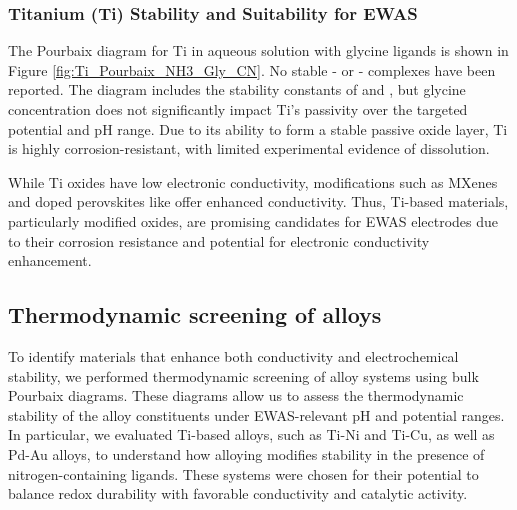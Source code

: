 \documentclass[journal=jacsat,manuscript=article]{achemso}
\begin{document}
\subsubsection{Titanium (Ti) Stability and Suitability for EWAS}
The Pourbaix diagram for Ti in aqueous solution with glycine ligands is shown in Figure \ref{fig:Ti_Pourbaix_NH3_Gly_CN}. No stable - or - complexes have been reported\cite{Griffith1962CyanideMetals, Nicholls1980ComplexTitanium}. The diagram includes the stability constants of \ce{[Ti(Gly)^-]} and \ce{[Ti(Gly)_2^+]}, but glycine concentration does not significantly impact Ti's passivity over the targeted potential and pH range. Due to its ability to form a stable passive oxide layer\cite{Kiss1991CriticalGlycine, PourbaixAtlasSolutions}, Ti is highly corrosion-resistant, with limited experimental evidence of dissolution\cite{Schmidt2009AqueousVoltammetry, Ziemniak1993SolubilityTemperatures, Knauss2001TiIV300C, Schmidt2006DissolutionEffect, Pocsi1988ComplexAcid}.

While Ti oxides have low electronic conductivity, modifications such as MXenes\cite{Gardon2013ImprovedSpray, Naguib2012Two-DimensionalCarbides, Hui2022VacancyBatteries} and doped perovskites like \cite{Sokolov2024ComputationalTitanate} offer enhanced conductivity. Thus, Ti-based materials, particularly modified oxides, are promising candidates for EWAS electrodes due to their corrosion resistance and potential for electronic conductivity enhancement.

\subsection{Thermodynamic screening of alloys} \label{sec:alloy_screening}

To identify materials that enhance both conductivity and electrochemical stability, we performed thermodynamic screening of alloy systems using bulk Pourbaix diagrams. These diagrams allow us to assess the thermodynamic stability of the alloy constituents under EWAS-relevant pH and potential ranges. In particular, we evaluated Ti-based alloys, such as Ti-Ni and Ti-Cu, as well as Pd-Au alloys, to understand how alloying modifies stability in the presence of nitrogen-containing ligands. These systems were chosen for their potential to balance redox durability with favorable conductivity and catalytic activity.
\end{document}
